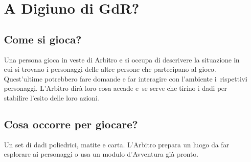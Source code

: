 \documentclass[itdr]{subfiles}
\begin{document}
\vfill
{}

\vfill
\section*{A Digiuno di GdR?}

\subsection*{Come si gioca?}
Una persona gioca in veste di Arbitro e si occupa di descrivere la situazione in cui si trovano i personaggi delle altre persone che partecipano al gioco. Quest’ultime potrebbero fare domande e far interagire con l'ambiente i~rispettivi personaggi. L’Arbitro dirà loro cosa accade e~se serve che tirino i dadi per stabilire l’esito delle loro azioni.

\subsection*{Cosa occorre per giocare?}
Un set di dadi poliedrici, matite e carta. L’Arbitro prepara un luogo da far esplorare ai personaggi o usa un modulo d’Avventura già pronto.
\end{document}

